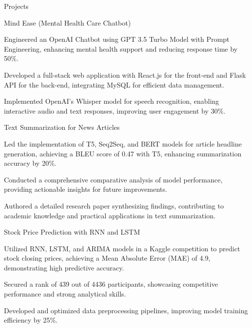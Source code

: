 \documentclass{resume} %
\begin{document}
    \begin{rSection}{Projects}
                    \begin{rSubsection}
                                    {Mind Ease (Mental Health Care Chatbot)}
                                {}{}{}
                                    \item Engineered an OpenAI Chatbot using GPT 3.5 Turbo Model with Prompt Engineering, enhancing mental health support and reducing response time by 50\%.
                                    \item Developed a full{-}stack web application with React.js for the front{-}end and Flask API for the back{-}end, integrating MySQL for efficient data management.
                                    \item Implemented OpenAI's Whisper model for speech recognition, enabling interactive audio and text responses, improving user engagement by 30\%.
                            \end{rSubsection}
                    \begin{rSubsection}
                                    {Text Summarization for News Articles}
                                {}{}{}
                                    \item Led the implementation of T5, Seq2Seq, and BERT models for article headline generation, achieving a BLEU score of 0.47 with T5, enhancing summarization accuracy by 20\%.
                                    \item Conducted a comprehensive comparative analysis of model performance, providing actionable insights for future improvements.
                                    \item Authored a detailed research paper synthesizing findings, contributing to academic knowledge and practical applications in text summarization.
                            \end{rSubsection}
                    \begin{rSubsection}
                                    {Stock Price Prediction with RNN and LSTM}
                                {}{}{}
                                    \item Utilized RNN, LSTM, and ARIMA models in a Kaggle competition to predict stock closing prices, achieving a Mean Absolute Error (MAE) of 4.9, demonstrating high predictive accuracy.
                                    \item Secured a rank of 439 out of 4436 participants, showcasing competitive performance and strong analytical skills.
                                    \item Developed and optimized data preprocessing pipelines, improving model training efficiency by 25\%.
                            \end{rSubsection}
            \end{rSection}
\end{document}

